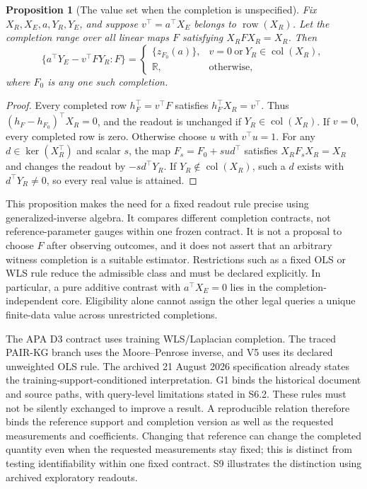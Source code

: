 \documentclass[11pt]{article}
\newtheorem{proposition}{Proposition}
\begin{document}
\begin{proposition}[The value set when the completion is unspecified]
\label{prop:completionvalueset}
Fix $X_R,X_E,a,Y_R,Y_E$, and suppose $v^\top=a^\top X_E$ belongs to $\operatorname{row}(X_R)$. Let the completion range over all linear maps $F$ satisfying $X_RFX_R=X_R$. Then
\[
\{a^\top Y_E-v^\top FY_R:F\}
=\begin{cases}
\{z_{F_0}(a)\},&v=0\ \text{or}\ Y_R\in\operatorname{col}(X_R),\\
\mathbb R,&\text{otherwise},
\end{cases}
\]
where $F_0$ is any one such completion.
\end{proposition}
\begin{proof}
Every completed row $h_F^\top=v^\top F$ satisfies $h_F^\top X_R=v^\top$. Thus $(h_F-h_{F_0})^\top X_R=0$, and the readout is unchanged if $Y_R\in\operatorname{col}(X_R)$. If $v=0$, every completed row is zero. Otherwise choose $u$ with $v^\top u=1$. For any $d\in\ker(X_R^\top)$ and scalar $s$, the map $F_s=F_0+sud^\top$ satisfies $X_RF_sX_R=X_R$ and changes the readout by $-s d^\top Y_R$. If $Y_R\notin\operatorname{col}(X_R)$, such a $d$ exists with $d^\top Y_R\ne0$, so every real value is attained.
\end{proof}
This proposition makes the need for a fixed readout rule precise using generalized-inverse algebra. It compares different completion contracts, not reference-parameter gauges within one frozen contract. It is not a proposal to choose $F$ after observing outcomes, and it does not assert that an arbitrary witness completion is a suitable estimator. Restrictions such as a fixed OLS or WLS rule reduce the admissible class and must be declared explicitly. In particular, a pure additive contrast with $a^\top X_E=0$ lies in the completion-independent core. Eligibility alone cannot assign the other legal queries a unique finite-data value across unrestricted completions.

The APA D3 contract uses training WLS/Laplacian completion. The traced PAIR-KG branch uses the Moore--Penrose inverse, and V5 uses its declared unweighted OLS rule. The archived 21 August 2026 specification already states the training-support-conditioned interpretation. G1 binds the historical document and source paths, with query-level limitations stated in S6.2. These rules must not be silently exchanged to improve a result. A reproducible relation therefore binds the reference support and completion version as well as the requested measurements and coefficients. Changing that reference can change the completed quantity even when the requested measurements stay fixed; this is distinct from testing identifiability within one fixed contract. S9 illustrates the distinction using archived exploratory readouts.
\end{document}
